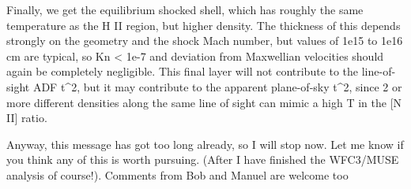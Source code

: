 \documentclass[11pt]{article}
\begin{document}
Finally, we get the equilibrium shocked shell, which has roughly the same temperature as the H II region, but higher density.  The thickness of this depends strongly on the geometry and the shock Mach number, but values of 1e15 to 1e16 cm are typical, so Kn < 1e-7 and deviation from Maxwellian velocities should again be completely negligible.  This final layer will not contribute to the line-of-sight ADF t\^{}2, but it may contribute to the apparent plane-of-sky t\^{}2, since 2 or more different densities along the same line of sight can mimic a high T in the [N II] ratio.

Anyway, this message has got too long already, so I will stop now.  Let me know if you think any of this is worth pursuing.  (After I have finished the WFC3/MUSE analysis of course!). Comments from Bob and Manuel are welcome too
\end{document}
